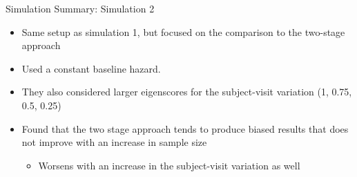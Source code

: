\documentclass[
  ignorenonframetext,
]{beamer}
\providecommand{\tightlist}{%
  \setlength{\itemsep}{0pt}\setlength{\parskip}{0pt}}
\begin{document}
\begin{frame}{Simulation Summary: Simulation 2}
\protect\hypertarget{simulation-summary-simulation-2}{}
\begin{itemize}
\tightlist
\item
  Same setup as simulation 1, but focused on the comparison to the
  two-stage approach
\item
  Used a constant baseline hazard.
\item
  They also considered larger eigenscores for the subject-visit
  variation (1, 0.75, 0.5, 0.25)
\item
  Found that the two stage approach tends to produce biased results that
  does not improve with an increase in sample size

  \begin{itemize}
  \tightlist
  \item
    Worsens with an increase in the subject-visit variation as well
  \end{itemize}
\end{itemize}
\end{frame}
\end{document}
